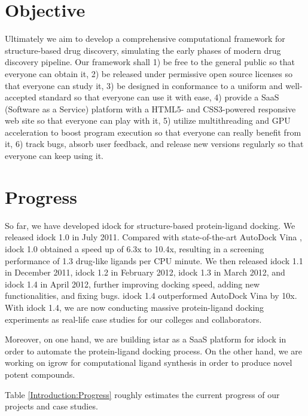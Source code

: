 \section{Objective}

Ultimately we aim to develop a comprehensive computational framework for structure-based drug discovery, simulating the early phases of modern drug discovery pipeline. Our framework shall 1) be free to the general public so that everyone can obtain it, 2) be released under permissive open source licenses so that everyone can study it, 3) be designed in conformance to a uniform and well-accepted standard so that everyone can use it with ease, 4) provide a SaaS (Software as a Service) platform with a HTML5- and CSS3-powered responsive web site so that everyone can play with it, 5) utilize multithreading and GPU acceleration to boost program execution so that everyone can really benefit from it, 6) track bugs, absorb user feedback, and release new versions regularly so that everyone can keep using it.

\section{Progress}

So far, we have developed idock for structure-based protein-ligand docking. We released idock 1.0 in July 2011. Compared with state-of-the-art AutoDock Vina \citep{595}, idock 1.0 obtained a speed up of 6.3x to 10.4x, resulting in a screening performance of 1.3 drug-like ligands per CPU minute. We then released idock 1.1 in December 2011, idock 1.2 in February 2012, idock 1.3 in March 2012, and idock 1.4 in April 2012, further improving docking speed, adding new functionalities, and fixing bugs. idock 1.4 outperformed AutoDock Vina by 10x. With idock 1.4, we are now conducting massive protein-ligand docking experiments as real-life case studies for our colleges and collaborators.

Moreover, on one hand, we are building istar as a SaaS platform for idock in order to automate the protein-ligand docking process. On the other hand, we are working on igrow for computational ligand synthesis in order to produce novel potent compounds.

Table \ref{Introduction:Progress} roughly estimates the current progress of our projects and case studies.

